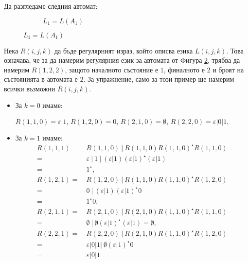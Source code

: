 \begin{example}
  Да разгледаме следния автомат:
  
  \begin{figure}[h!]
    \begin{subfigure}[b]{0.3\textwidth}
      \label{subf:a1}
      \caption{$L_1 = L(A_1)$}
    \end{subfigure}
 \end{figure}

Нека $R(i,j,k)$ да бъде регулярният израз, който описва езика $L(i,j,k)$.
Това означава, че за да намерим регулярния език за автомата от Фигура \ref{subf:a1}, 
трябва да намерим $R(1,2,2)$, защото началното състояние е $1$, финалното е $2$ и 
броят на състоянията в автомата е $2$.
За упражнение, само за този пример ще намерим всички възможни $R(i,j,k)$.
\begin{itemize}
\item 
  За $k = 0$ имаме:
  
  $R(1,1,0) = \varepsilon\vert 1$, $R(1,2,0) = 0$, $R(2,1,0) = \emptyset$, $R(2,2,0) = \varepsilon\vert 0 \vert 1$,
\item
  За $k = 1$ имаме:
  \begin{align*}
    R(1,1,1) =\ & R(1,1,0)\ \vert\ R(1,1,0) R(1,1,0)^\star R(1,1,0) \\
    =\ &\varepsilon\ \vert\ 1\ \vert\ (\varepsilon \vert 1)(\varepsilon\vert 1)^\star(\varepsilon \vert 1)\\
    =\ & 1^\star,\\
    R(1,2,1) =\ & R(1,2,0)\ \vert\ R(1,1,0) R(1,1,0)^\star R(1,2,0)\\
    =\ & 0\ \vert\ (\varepsilon \vert 1)(\varepsilon \vert 1)^\star0\\
    =\ & 1^\star0,\\
    R(2,1,1) =\ & R(2,1,0)\ \vert\ R(2,1,0)R(1,1,0)^\star R(1,1,0) \\
    =\ & \emptyset\ \vert\ \emptyset (\varepsilon\vert 1)^\star(\varepsilon \vert 1) = \emptyset,\\
    R(2,2,1) =\ & R(2,2,0)\ \vert\ R(2,1,0)R(1,1,0)^\star R(1,2,0)\\
    =\ & \varepsilon\vert 0 \vert 1\vert\ \emptyset(\varepsilon \vert 1)^\star0\\
    =\ &  \varepsilon\vert 0 \vert 1
  \end{align*}
    

\end{itemize}
\end{example}
